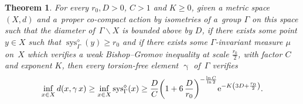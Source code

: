 \documentclass[pdftex]{sigma}
\numberwithin{equation}{section}
\newtheorem{theor}{Theorem}[section]
\newcommand{\sys}{\operatorname{sys}}
\newcommand{\g}{\operatorname{\gamma}}
\begin{document}
\begin{theor}\label{minorsystole}
For every $r_0, D >0$, $C > 1 $ and $K\ge 0$, given a metric space $(X,d)$ and a~proper co-compact action by isometries of a~group
$\Gamma $ on this space such that the diameter of~$\Gamma \backslash X$ is bounded above by $D$, if there exists some point $y\in X$ such that $\sys^{\diamond}_\Gamma (y) \ge r_0$ and if there exists some
$\Gamma$-invariant measure $\mu$ on~$X$ which verifies a weak Bishop--Gromov inequality at scale $\frac{r_0}{2}$, with factor $C$ and exponent $K$,
then every torsion-free element $\g$ of~$\Gamma$ verifies
\begin{gather*}
\inf_{x \in X} d(x, \g x) \ge \inf_{x \in X} \sys^{\diamond}_\Gamma (x)
\ge \frac{D}{C} \bigg( 1 + 6\, \frac{D}{r_0}\bigg)^{- \frac{\ln C}{\ln 2}} {\rm e}^{- K\left (3 D + \frac{r_0}{2}\right)}.
\end{gather*}
\end{theor}
\end{document}
